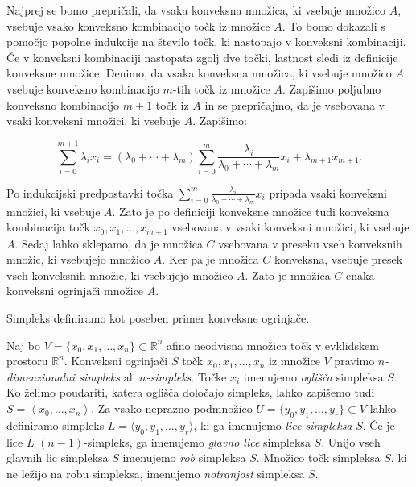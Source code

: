 \documentclass[mat1]{fmfdelo}
\newcommand{\R}{\mathbb R}
\newcommand{\0}{0}
\begin{document}
\begin{dokaz}
Najprej se bomo prepričali, da vsaka konveksna množica, ki vsebuje množico $A$, vsebuje vsako konveksno kombinacijo točk iz množice $A$. To bomo dokazali s pomočjo popolne indukcije na število točk, ki nastopajo v konveksni kombinaciji. Če v konveksni kombinaciji nastopata zgolj dve točki, lastnost sledi iz definicije konveksne množice. Denimo, da vsaka konveksna množica, ki vsebuje množico $A$ vsebuje konveksno kombinacijo $m$-tih točk iz množice $A$. Zapišimo poljubno konveksno kombinacijo $m+1$ točk iz $A$ in se prepričajmo, da je vsebovana v vsaki konveksni množici, ki vsebuje $A$. Zapišimo:

$$\sum\limits_{i=0}^{m+1} \lambda_i x_i =(\lambda_0 + \cdots + \lambda_m) \sum\limits_{i=0}^m \frac{\lambda_i}{\lambda_0 + \cdots + \lambda_m } x_i + \lambda_{m+1} x_{m+1}.$$

Po indukcijski predpostavki točka $\sum\limits_{i=0}^m \frac{\lambda_i}{\lambda_0 + \cdots + \lambda_m } x_i$ pripada vsaki konveksni množici, ki vsebuje $A$. Zato je po definiciji konveksne množice tudi konveksna kombinacija točk $x_0, x_1, \dots, x_{m+1}$ vsebovana v vsaki konveksni množici, ki vsebuje $A$.
Sedaj lahko sklepamo, da je množica $C$ vsebovana v preseku vseh konveksnih množic, ki vsebujejo množico $A$. Ker pa je množica $C$ konveksna, vsebuje presek vseh konveksnih množic, ki vsebujejo množico $A$. Zato je množica $C$ enaka konveksni ogrinjači množice $A$.
\end{dokaz}

Simpleks definiramo kot poseben primer konveksne ogrinjače.
\begin{definicija}
Naj bo $V = \{x_0, x_1, \dots , x_n \} \subset \R^n$ afino neodvisna množica točk v evklidskem prostoru $\R^n$. Konveksni ogrinjači $S$ točk $x_0, x_1, \dots , x_n$ iz množice $V$ pravimo \emph{$n$-dimenzionalni simpleks} ali \emph{$n$-simpleks}. Točke $x_i$ imenujemo \emph{oglišča} simpleksa $S$. Ko želimo poudariti, katera oglišča določajo simpleks, lahko zapišemo tudi $S = \left < x_0, \dots, x_n \right >$. Za vsako neprazno podmnožico $U = \{ y_0, y_1, \dots, y_r \} \subset V$ lahko definiramo simpleks $L = \langle y_0, y_1, \dots, y_r \rangle$, ki ga imenujemo \emph{lice simpleksa} $S$. Če je lice $L$ $(n-1)$-simpleks, ga imenujemo \emph{glavno lice} simpleksa $S$. Unijo vseh glavnih lic simpleksa $S$ imenujemo \emph{rob} simpleksa $S$. Množico točk simpleksa $S$, ki ne ležijo na robu simpleksa, imenujemo \emph{notranjost} simpleksa $S$.
\end{definicija}
\end{document}
